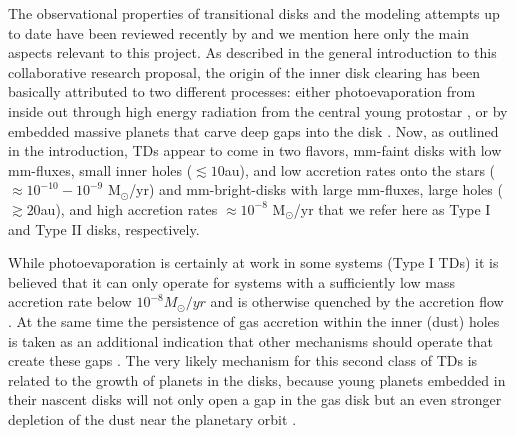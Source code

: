 \documentclass[10pt,fleqn,twoside]{article}
\begin{document}
The observational properties of transitional disks and the modeling attempts up to date
have been reviewed recently by \citet{2016PASA...33....5O} and we mention here only the main aspects 
relevant to this project.
As described in the general introduction to this collaborative research proposal,
the origin of the inner disk clearing has been basically attributed to two different processes:
either photoevaporation from inside out through high energy radiation from the central young protostar
\citep{1993Icar..106...92S,2006MNRAS.369..216A}, 
or by embedded massive planets that carve deep gaps into the disk \citep{2006ApJ...640.1110V}.
Now, as outlined in the introduction, TDs appear to come in two flavors, 
mm-faint disks with low mm-fluxes, small inner holes ($\lesssim 10$au), and low accretion rates
onto the stars ($\approx 10^{-10} - 10^{-9}$ M$_\odot$/yr)
and mm-bright-disks with large mm-fluxes, large holes ($\gtrsim 20$au), and high accretion rates
$\approx 10^{-8}$ M$_\odot$/yr \citep{2012MNRAS.426L..96O} that we refer here as  
Type I and Type II disks, respectively.

While photoevaporation is certainly at work in some systems (Type I TDs) it is believed that it can only
operate for systems with a sufficiently low mass accretion rate below $10^{-8} M_\odot/yr$
and is otherwise quenched by the accretion flow \citep{2012MNRAS.426L..96O}.
At the same time the persistence of gas accretion within the inner (dust) holes is taken as an additional
indication that other mechanisms should operate that create these gaps \citep{2014A&A...568A..18M}.
The very likely mechanism for this second class of TDs is related to the growth of planets in the disks,
because young planets embedded in their nascent disks will not only open a gap in the gas disk but an even stronger
depletion of the dust near the planetary orbit \citep{2004A&A...425L...9P}.
\end{document}
